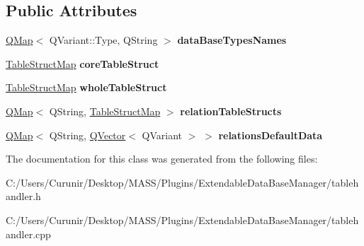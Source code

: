 \subsection*{Public Attributes}
\begin{DoxyCompactItemize}
\item 
\mbox{\label{class_table_handler_aebe2c16bead28b9a11ad25e964fbde6a}} 
\hyperlink{class_q_map}{Q\+Map}$<$ Q\+Variant\+::\+Type, Q\+String $>$ {\bfseries data\+Base\+Types\+Names}
\item 
\mbox{\label{class_table_handler_a811ecf820ead8c05091abe036f7684f2}} 
\hyperlink{class_q_map}{Table\+Struct\+Map} {\bfseries core\+Table\+Struct}
\item 
\mbox{\label{class_table_handler_aef50aa5b136d7eb5b7cdb790a05aa54e}} 
\hyperlink{class_q_map}{Table\+Struct\+Map} {\bfseries whole\+Table\+Struct}
\item 
\mbox{\label{class_table_handler_a1dbdb8acc499ed77a36af132fd9f66dd}} 
\hyperlink{class_q_map}{Q\+Map}$<$ Q\+String, \hyperlink{class_q_map}{Table\+Struct\+Map} $>$ {\bfseries relation\+Table\+Structs}
\item 
\mbox{\label{class_table_handler_a66165fb2776d61b546db6a5e0a63e604}} 
\hyperlink{class_q_map}{Q\+Map}$<$ Q\+String, \hyperlink{class_q_vector}{Q\+Vector}$<$ Q\+Variant $>$ $>$ {\bfseries relations\+Default\+Data}
\end{DoxyCompactItemize}


The documentation for this class was generated from the following files\+:\begin{DoxyCompactItemize}
\item 
C\+:/\+Users/\+Curunir/\+Desktop/\+M\+A\+S\+S/\+Plugins/\+Extendable\+Data\+Base\+Manager/tablehandler.\+h\item 
C\+:/\+Users/\+Curunir/\+Desktop/\+M\+A\+S\+S/\+Plugins/\+Extendable\+Data\+Base\+Manager/tablehandler.\+cpp\end{DoxyCompactItemize}
